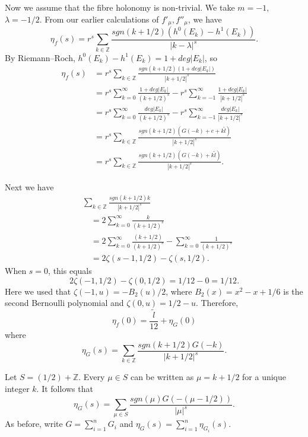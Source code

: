 \documentclass{amsart}
\theoremstyle{definition}
\theoremstyle{remark}
\numberwithin{equation}{section}
\begin{document}
Now we assume that the fibre holonomy is non-trivial. We take $m = -1$, $\lambda = -1/2$. From our earlier calculations of $f'_\mu, f''_\mu$, we have
\[
\eta_f(s) = r^s \sum_{k \in \mathbb{Z}} \frac{ sgn(k+1/2) ( h^0(E_k) - h^1(E_k) ) }{ |k - \lambda|^s }.
\]
By Riemann--Roch, $h^0( E_k) - h^1(E_k ) = 1 + deg| E_k |$, so
\begin{align*}
\eta_f(s) &= r^s \sum_{k \in \mathbb{Z}} \frac{ sgn(k+1/2)( 1 + deg| E_k| )}{ |k+1/2|^s } \\
&= r^s \sum_{k = 0}^{\infty} \frac{1 + deg|E_k |}{(k+1/2)^s} - r^s \sum_{k=-1}^{\infty} \frac{1 + deg|E_k|}{|k+1/2|^s} \\
&= r^s \sum_{k = 0}^{\infty} \frac{deg|E_k|}{(k+1/2)^s} - r^s \sum_{k=-1}^{\infty} \frac{deg|E_k|}{|k+1/2|^s} \\
&= r^s \sum_{k \in \mathbb{Z}} \frac{ sgn(k +1/2)( G(-k) + e + k \widetilde{l} ) }{ |k + 1/2|^s } \\
&= r^s \sum_{k \in \mathbb{Z}} \frac{ sgn(k +1/2)( G(-k) +  k\widetilde{l} ) }{ |k + 1/2|^s }.
\end{align*}

Next we have
\begin{align*}
& \sum_{k \in \mathbb{Z}} \frac{ sgn(k+1/2) k }{ |k+1/2|^s } \\
& \quad = 2\sum_{k=0}^{\infty} \frac{k}{(k+1/2)^s} \\
& \quad = 2 \sum_{k=0}^{\infty} \frac{ (k+1/2) }{(k+1/2)^s} - \sum_{k=0}^{\infty} \frac{ 1}{(k+1/2)^s} \\
& \quad = 2\zeta(s-1 , 1/2) - \zeta(s,1/2).
\end{align*}
When $s=0$, this equals
\[
2\zeta(-1,1/2) - \zeta(0,1/2) = 1/12 - 0 = 1/12.
\]
Here we used that $\zeta(-1,u) = -B_2(u)/2$, where $B_2(x) = x^2 - x + 1/6$ is the second Bernoulli polynomial and $\zeta(0,u) = 1/2 - u$. Therefore,
\[
\eta_f(0) = \frac{\widetilde{l}}{12} + \eta_G(0)
\]
where
\[
\eta_G(s) = \sum_{k \in \mathbb{Z}} \frac{ sgn(k+1/2)G(-k) }{ |k+1/2|^s}.
\]

Let $S = (1/2) + \mathbb{Z}$. Every $\mu \in S$ can be written as $\mu = k + 1/2$ for a unique integer $k$. It follows that
\[
\eta_G(s) = \sum_{\mu \in S} \frac{ sgn(\mu)G( -(\mu - 1/2) ) }{ |\mu|^s}.
\]
As before, write $G = \sum_{i=1}^n G_i$ and $\eta_G(s) = \sum_{i=1}^n \eta_{G_i}(s)$.
\end{document}

